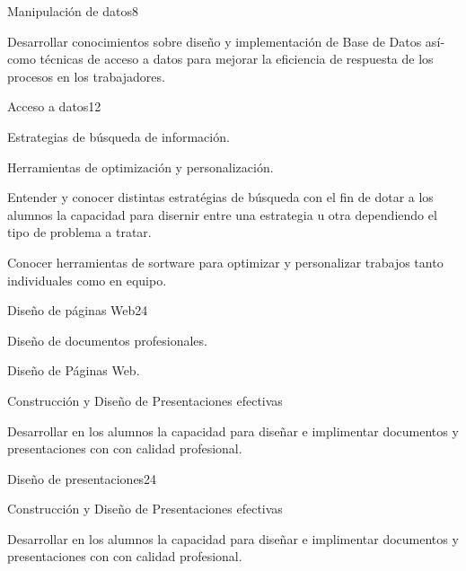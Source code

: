 \begin{syllabus}
\begin{unit}{Manipulación de datos}{}{8}
   \begin{learningoutcomes}
      \item  Desarrollar conocimientos sobre diseño y implementación de Base de Datos así­ como técnicas de acceso a datos para mejorar la eficiencia de respuesta de los procesos en los trabajadores.
   \end{learningoutcomes}
\end{unit}

\begin{unit}{Acceso a datos}{}{12}
   \begin{topics}
      \item Estrategias de búsqueda de información.
      \item Herramientas de optimización y personalización.
   \end{topics}

   \begin{learningoutcomes}
      \item Entender y conocer distintas estratégias de búsqueda con el fin de dotar a los alumnos la capacidad para disernir entre una estrategia  u otra dependiendo el tipo de problema a tratar.
      \item  Conocer herramientas de sortware para optimizar y personalizar trabajos tanto individuales como en equipo.
   \end{learningoutcomes}
\end{unit}

\begin{unit}{Diseño de páginas Web}{}{24}
   \begin{topics}
      \item Diseño de documentos profesionales.
      \item Diseño de Páginas Web.
      \item Construcción  y Diseño de Presentaciones  efectivas 
    \end{topics}
  \begin{learningoutcomes}
      \item Desarrollar en los alumnos la capacidad para diseñar  e implimentar documentos y presentaciones con 
       con calidad profesional.
  \end{learningoutcomes}
\end{unit}

\begin{unit}{Diseño de presentaciones}{}{24}
   \begin{topics}
      \item Construcción  y Diseño de Presentaciones  efectivas 
    \end{topics}
  \begin{learningoutcomes}
      \item Desarrollar en los alumnos la capacidad para diseñar  e implimentar documentos y presentaciones con 
       con calidad profesional.
  \end{learningoutcomes}
\end{unit}


\end{syllabus}
